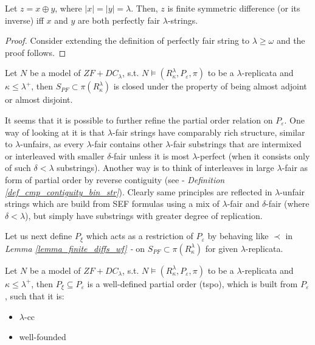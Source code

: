 \begin{lemma}\label{def_almost_addisjoint_lambda_fair}
    Let $z = x \oplus y$, where $|x| = |y| = \lambda$. Then, $z$ is finite symmetric difference (or its inverse) iff $x$ and $y$ are both perfectly fair $\lambda$-strings.
\end{lemma}
\begin{proof}
    Consider extending the definition of perfectly fair string to $\lambda \geq \omega$ and the proof follows.
\end{proof}

\begin{corollary}\label{corollary_closure_perfect_lambda_fairs}
    Let $N$ be a model of $ZF+DC_\lambda$, s.t. $N \models (R^\lambda_\kappa, P_{\varepsilon}, \pi)$ to be a $\lambda$-replicata and $\kappa \leq \lambda^+$, then $S_{PF} \subset \pi(R^\lambda_\kappa)$ is closed under the property of being almost adjoint or almost disjoint.
\end{corollary}



It seems that it is possible to further refine the partial order relation on $P_{\varepsilon}$. One way of looking at it is that $\lambda$-fair strings have comparably rich structure, similar to $\lambda$-unfairs, as every $\lambda$-fair contains other $\lambda$-fair substrings that are intermixed or interleaved with smaller $\delta$-fair unless it is most $\lambda$-perfect (when it consists only of such $\delta < \lambda$ substrings). Another way is to think of interleaves in large $\lambda$-fair as form of partial order by reverse contiguity (see - \textit{Definition \ref{def_cmp_contiguity_bin_str}}). Clearly same principles are reflected in $\lambda$-unfair strings which are build from SEF formulas using a mix of $\lambda$-fair and $\delta$-fair (where $\delta < \lambda$), but simply have substrings with greater degree of replication. 

Let us next define $P_{\xi}$ which acts as a restriction of $P_{\varepsilon}$ by behaving like $\prec$ in \textit{Lemma \ref{lemma_finite_diffs_wf} - } on  $S_{PF} \subset \pi(R^\lambda_\kappa)$ for given $\lambda$-replicata.

\begin{lemma}\label{lemma_wf_po_lambda_rep}
    Let $N$ be a model of $ZF+DC_\lambda$, s.t. $N \models (R^\lambda_\kappa, P_{\varepsilon}, \pi)$ to be a $\lambda$-replicata and $\kappa \leq \lambda^+$, then $P_{\xi} \subseteq P_{\varepsilon}$ is a well-defined partial order (tspo), which is built from $P_{\varepsilon}$, such that it is:
    \begin{itemize}
        \item $\lambda$-cc
        \item well-founded
    \end{itemize}
\end{lemma}

